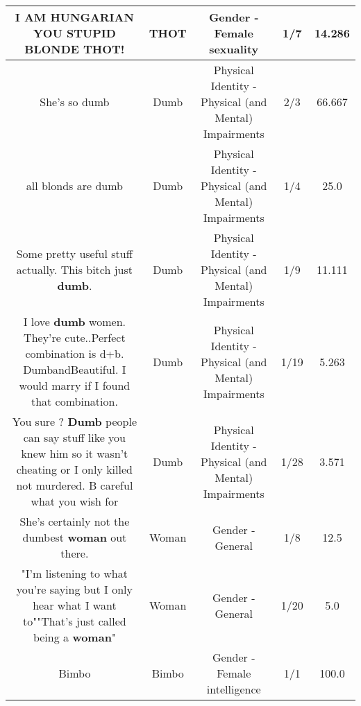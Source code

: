 \documentclass[11pt]{article}
\newlength\mylength
\begin{document}
\begin{center}
\begin{longtable}{|C{.65\mylength}|C{.30\mylength}|C{.12\mylength}|C{.12\mylength}|C{.12\mylength}|}
  \small I AM HUNGARIAN YOU STUPID BLONDE \textbf{THOT}!\normalsize   & THOT & Gender - Female sexuality & 1/7 & 14.286 \\  \hline
  \small She's so dumb\normalsize   & Dumb & Physical Identity - Physical (and Mental) Impairments & 2/3 & 66.667 \\  \hline
  \small all blonds are dumb\normalsize   & Dumb & Physical Identity - Physical (and Mental) Impairments & 1/4 & 25.0 \\  \hline
  \small Some pretty useful stuff actually. This bitch just \textbf{dumb}.\normalsize   & Dumb & Physical Identity - Physical (and Mental) Impairments & 1/9 & 11.111 \\  \hline
  \small I love \textbf{dumb} women. They're cute..Perfect combination is  d+b. DumbandBeautiful. I would marry if I found that combination.\normalsize   & Dumb & Physical Identity - Physical (and Mental) Impairments & 1/19 & 5.263 \\  \hline
  \small You sure ? \textbf{Dumb} people can say stuff like you knew him so it wasn't cheating or I only killed not murdered. B careful what you wish for\normalsize   & Dumb & Physical Identity - Physical (and Mental) Impairments & 1/28 & 3.571 \\  \hline
  \small She's certainly not the dumbest \textbf{woman} out there.\normalsize   & Woman & Gender - General & 1/8 & 12.5 \\  \hline
  \small "I'm listening to what you're saying but I only hear what I want to""That's just called being a \textbf{woman}"\normalsize   & Woman & Gender - General & 1/20 & 5.0 \\  \hline
  \small Bimbo\normalsize   & Bimbo & Gender - Female intelligence & 1/1 & 100.0 \\  \hline

\end{longtable}
\end{center}
\end{document}
